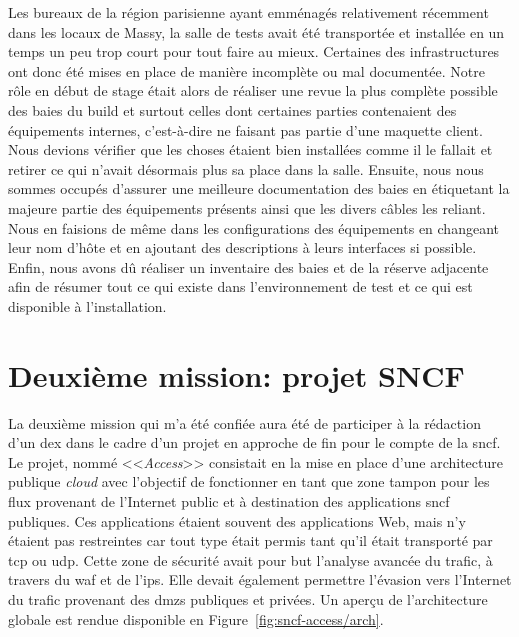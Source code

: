 \documentclass[12pt, oneside, a4paper, titlepage]{report}
\begin{document}
Les bureaux de la région parisienne ayant emménagés relativement récemment dans
les locaux de Massy, la salle de tests avait été transportée et installée en un
temps un peu trop court pour tout faire au mieux. Certaines des infrastructures
ont donc été mises en place de manière incomplète ou mal documentée. Notre rôle
en début de stage était alors de réaliser une revue la plus complète possible
des baies du \gls{build} et surtout celles dont certaines parties contenaient
des équipements internes, c'est-à-dire ne faisant pas partie d'une maquette
client. Nous devions vérifier que les choses étaient bien installées comme il le
fallait et retirer ce qui n'avait désormais plus sa place dans la salle.
Ensuite, nous nous sommes occupés d'assurer une meilleure documentation des
baies en étiquetant la majeure partie des équipements présents ainsi que les
divers câbles les reliant. Nous en faisions de même dans les configurations des
équipements en changeant leur nom d'hôte et en ajoutant des descriptions à leurs
interfaces si possible. Enfin, nous avons dû réaliser un inventaire des baies et
de la réserve adjacente afin de résumer tout ce qui existe dans l'environnement
de test et ce qui est disponible à l'installation.


\section{Deuxième mission: projet SNCF}%
\label{sec:mission::deuz}

La deuxième mission qui m'a été confiée aura été de participer à la rédaction
d'un \acrfull{dex} dans le cadre d'un projet en approche de fin pour le compte
de la \gls{sncf}. Le projet, nommé <<\textit{Access}>> consistait en la mise en
place d'une architecture publique \textit{cloud} avec l'objectif de fonctionner
en tant que zone tampon pour les flux provenant de l'Internet public et à
destination des applications \gls{sncf} publiques. Ces applications étaient
souvent des applications Web, mais n'y étaient pas restreintes car tout type
était permis tant qu'il était transporté par \gls{tcp} ou \gls{udp}. Cette zone
de sécurité avait pour but l'analyse avancée du trafic, à travers du \gls{waf}
et de l'\gls{ips}.  Elle devait également permettre l'évasion vers l'Internet du
trafic provenant des \glspl{dmz} publiques et privées. Un aperçu de
l'architecture globale est rendue disponible en
Figure~\ref{fig:sncf-access/arch}.
\end{document}
